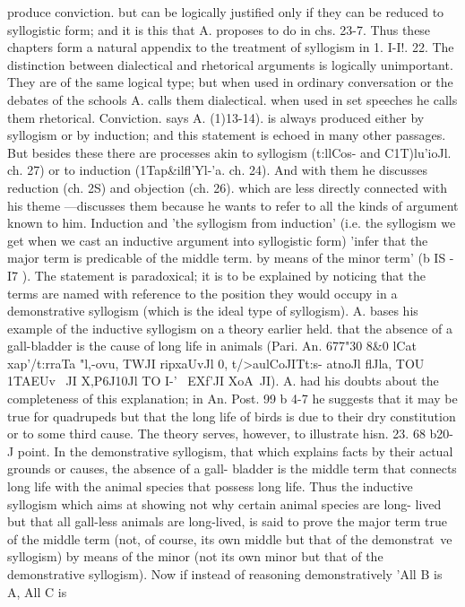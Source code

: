 {{{{{{{{{{{{{{{{{{produce conviction. but can be logically justified only if they can
be reduced to syllogistic form; and it is this that A. proposes to
do in chs. 23-7. Thus these chapters form a natural appendix to
the treatment of syllogism in 1. I-I!. 22.
The distinction between dialectical and rhetorical arguments
is logically unimportant. They are of the same logical type; but
when used in ordinary conversation or the debates of the schools
A. calls them dialectical. when used in set speeches he calls them
rhetorical.
Conviction. says A. (1)13-14). is always produced either by
syllogism or by induction; and this statement is echoed in many
other passages. But besides these there are processes akin to
syllogism (t:llCos- and C1T)lu'ioJl. ch. 27) or to induction (1Tap&ilfl'Yl-'a.
ch. 24). And with them he discusses reduction (ch. 2S) and
objection (ch. 26). which are less directly connected with his theme
---discusses them because he wants to refer to all the kinds of
argument known to him.
Induction and 'the syllogism from induction' (i.e. the syllogism
we get when we cast an inductive argument into syllogistic form)
'infer that the major term is predicable of the middle term. by
means of the minor term' (b IS - I7 ). The statement is paradoxical;
it is to be explained by noticing that the terms are named with
reference to the position they would occupy in a demonstrative
syllogism (which is the ideal type of syllogism). A. bases his
example of the inductive syllogism on a theory earlier held. that
the absence of a gall-bladder is the cause of long life in animals
(Pari. An. 677"30 8&0 lCat xap'/t:rraTa "l,-ovu, TWJI ripxaUvJl 0,
t/>aulCoJITt:s- atnoJl flJla, TOU 1TAEUv {~JI X,P6J10Jl TO I-'~ EXf'JI XoA~JI).
A. had his doubts about the completeness of this explanation;
in An. Post. 99 b 4-7 he suggests that it may be true for quadrupeds
but that the long life of birds is due to their dry constitution or to
some third cause. The theory serves, however, to illustrate hisn. 23. 68 b20-J
point. In the demonstrative syllogism, that which explains
facts by their actual grounds or causes, the absence of a gall-
bladder is the middle term that connects long life with the
animal species that possess long life. Thus the inductive syllogism
which aims at showing not why certain animal species are long-
lived but that all gall-less animals are long-lived, is said to prove
the major term true of the middle term (not, of course, its own
middle but that of the demonstrat~ve syllogism) by means of the
minor (not its own minor but that of the demonstrative syllogism).
Now if instead of reasoning demonstratively 'All B is A, All C is
}}}}}}}}}}}}}}}}}}}
